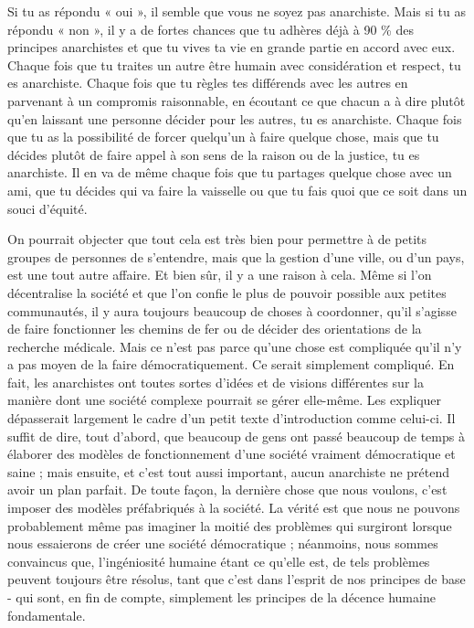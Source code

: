 Si tu as répondu « oui », il semble que vous ne soyez pas anarchiste. Mais si tu as répondu « non », il y a de fortes chances que tu adhères déjà à 90 \% des principes anarchistes et que tu vives ta vie en grande partie en accord avec eux. Chaque fois que tu traites un autre être humain avec considération et respect, tu es anarchiste. Chaque fois que tu règles tes différends avec les autres en parvenant à un compromis raisonnable, en écoutant ce que chacun a à dire plutôt qu'en laissant une personne décider pour les autres, tu es anarchiste. Chaque fois que tu as la possibilité de forcer quelqu'un à faire quelque chose, mais que tu décides plutôt de faire appel à son sens de la raison ou de la justice, tu es anarchiste. Il en va de même chaque fois que tu partages quelque chose avec un ami, que tu décides qui va faire la vaisselle ou que tu fais quoi que ce soit dans un souci d'équité.

On pourrait objecter que tout cela est très bien pour permettre à de petits groupes de personnes de s'entendre, mais que la gestion d'une ville, ou d'un pays, est une tout autre affaire. Et bien sûr, il y a une raison à cela. Même si l'on décentralise la société et que l'on confie le plus de pouvoir possible aux petites communautés, il y aura toujours beaucoup de choses à coordonner, qu'il s'agisse de faire fonctionner les chemins de fer ou de décider des orientations de la recherche médicale. Mais ce n'est pas parce qu'une chose est compliquée qu'il n'y a pas moyen de la faire démocratiquement. Ce serait simplement compliqué. En fait, les anarchistes ont toutes sortes d'idées et de visions différentes sur la manière dont une société complexe pourrait se gérer elle-même. Les expliquer dépasserait largement le cadre d'un petit texte d'introduction comme celui-ci. Il suffit de dire, tout d'abord, que beaucoup de gens ont passé beaucoup de temps à élaborer des modèles de fonctionnement d'une société vraiment démocratique et saine ; mais ensuite, et c'est tout aussi important, aucun anarchiste ne prétend avoir un plan parfait. De toute façon, la dernière chose que nous voulons, c'est imposer des modèles préfabriqués à la société. La vérité est que nous ne pouvons probablement même pas imaginer la moitié des problèmes qui surgiront lorsque nous essaierons de créer une société démocratique ; néanmoins, nous sommes convaincus que, l'ingéniosité humaine étant ce qu'elle est, de tels problèmes peuvent toujours être résolus, tant que c'est dans l'esprit de nos principes de base - qui sont, en fin de compte, simplement les principes de la décence humaine fondamentale.

